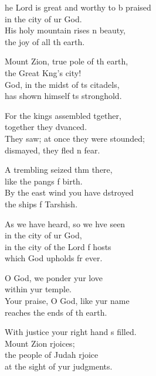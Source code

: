 \settowidth{\versewidth}{The Lord is great and worthy to be praised *}
\begin{psalmverse}%
  \begin{patverse}
    he Lord is great and worthy to b praised\Med\\
in the city of ur God.\\
His holy mountain rises \pointup{\i}n beauty,\Med\\
the joy of all th earth.

Mount Zion, true pole of th earth,\Med\\
the Great K\pointup{\i}ng’s city!\\
God, in the midst of \pointup{\i}ts citadels,\Med\\
has shown himself \pointup{\i}ts stronghold.

For the kings assembled tgether,\Med\\
together they dvanced.\\
They saw; at once they were stounded;\Med\\
dismayed, they fled \pointup{\i}n fear.

A trembling seized thm there,\Med\\
like the pangs f birth.\\
By the east wind you have dstroyed\Med\\
the ships f Tarshish.

As we have heard, so we hve seen\Med\\
in the city of ur God,\\
in the city of the Lord f hosts\Med\\
which God upholds fr ever.

O God, we ponder yur love\Med\\
within yur temple.\\
Your praise, O God, like yur name\Med\\
reaches the ends of th earth.

With justice your right hand \pointup{\i}s filled.\Med\\
Mount Zion rjoices;\\
the people of Judah rjoice\Med\\
at the sight of yur judgments.


\end{patverse}
\end{psalmverse}
